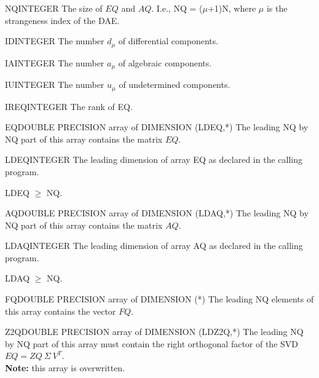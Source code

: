 \begin{entry}{NQ}{INTEGER}
  The size of $EQ$ and $AQ$. I.e., NQ = ($\mu$+1)N, where $\mu$ is
  the strangeness index of the DAE. 
\end{entry}

\begin{entry}{ID}{INTEGER}
  The number $d_{\mu}$ of differential components.
\end{entry}

\begin{entry}{IA}{INTEGER}
  The number $a_{\mu}$ of algebraic components. 
\end{entry}

\begin{entry}{IU}{INTEGER}
  The number $u_{\mu}$ of undetermined components. 
\end{entry}

\begin{entry}{IREQ}{INTEGER}
  The rank of EQ.
\end{entry}

\begin{entry}{EQ}{DOUBLE PRECISION array of DIMENSION (LDEQ,*)}
  The leading NQ by NQ part of this array contains the
  matrix $EQ$.
\end{entry}

\begin{entry}{LDEQ}{INTEGER}
  The leading dimension of array EQ as declared in the calling program.

  LDEQ $\ge $ NQ.
\end{entry}

\begin{entry}{AQ}{DOUBLE PRECISION array of DIMENSION (LDAQ,*)}
  The leading NQ by NQ part of this array contains the
  matrix $AQ$.
\end{entry}

\begin{entry}{LDAQ}{INTEGER}
  The leading dimension of array AQ as declared in the calling program.

  LDAQ $\ge$ NQ.
\end{entry}

\begin{entry}{FQ}{DOUBLE PRECISION array of DIMENSION (*)}
  The leading NQ elements of this array contains the vector $FQ$.
\end{entry}

\begin{entry}{Z2Q}{DOUBLE PRECISION array of DIMENSION (LDZ2Q,*)}
  The leading NQ by NQ part of this array must contain the
  right orthogonal factor of the SVD $EQ = ZQ\ \Sigma\ V^T$.\\
  {\bf Note:} this array is overwritten.
\end{entry}

